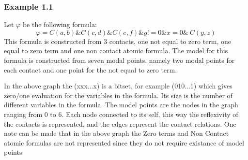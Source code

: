 \documentclass{article}
\begin{document}
			\subsubsection*{Example 1.1}
				Let $\varphi$ be the following formula:
				\begin{equation*}
					\varphi = C(a,b) \& C(c,d) \& C(e,f) \& g != 0 \& x = 0 \& ~C(y,z)
				\end{equation*}
				This formula is constructed from 3 contacts, one not equal to zero term, one equal to zero term 
				and one non contact atomic formula.
				\newline
				The model for this formula is constructed from seven modal points, namely two modal points for each
				contact and one point for the not equal to zero term.
				\newline
				\newline
				In the above graph the (xxx...x) is a bitset, for example (010...1) which gives zero/one evaluation
				for the variables in the formula. Its size is the number of different variables in the formula.
				The model points are the nodes in the graph ranging from 0 to 6. 
				Each node connected to its self, this way the reflexivity of the contacts is represented, and the 
				edges represent the contact relations.
				\newline
				One note can be made that in the above graph the Zero terms and Non Contact atomic formulas are 
				not represented since they do not require existance of model points.
\end{document}

